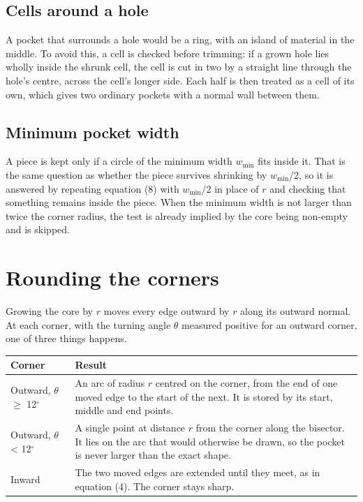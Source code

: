 \documentclass[11pt,a4paper]{article}
\begin{document}
\subsection{Cells around a hole}
 

A pocket that surrounds a hole would be a ring, with an island of material in the middle. To avoid this, a cell is checked before trimming: if a grown hole lies wholly inside the shrunk cell, the cell is cut in two by a straight line through the hole's centre, across the cell's longer side. Each half is then treated as a cell of its own, which gives two ordinary pockets with a normal wall between them. 

\subsection{Minimum pocket width}
 

A piece is kept only if a circle of the minimum width $w_{\mathrm{min}}$ fits inside it. That is the same question as whether the piece survives shrinking by $w_{\mathrm{min}}$/2, so it is answered by repeating equation (8) with $w_{\mathrm{min}}$/2 in place of $r$ and checking that something remains inside the piece. When the minimum width is not larger than twice the corner radius, the test is already implied by the core being non-empty and is skipped. 

\section{Rounding the corners}
 

Growing the core by $r$ moves every edge outward by $r$ along its outward normal. At each corner, with the turning angle $\theta $ measured positive for an outward corner, one of three things happens. 

\begin{center}
\begin{tabular}{>{\raggedright\arraybackslash}p{}>{\raggedright\arraybackslash}p{}}
\toprule
Corner & Result \\
\midrule
Outward, $\theta $ $\ge $ 12$^\circ $ & An arc of radius $r$ centred on the corner, from the end of one moved edge to the start of the next. It is stored by its start, middle and end points. \\
Outward, $\theta $ < 12$^\circ $ & A single point at distance $r$ from the corner along the bisector. It lies on the arc that would otherwise be drawn, so the pocket is never larger than the exact shape. \\
Inward & The two moved edges are extended until they meet, as in equation (4). The corner stays sharp. \\
\bottomrule
\end{tabular}
\end{center}
 
\end{document}
